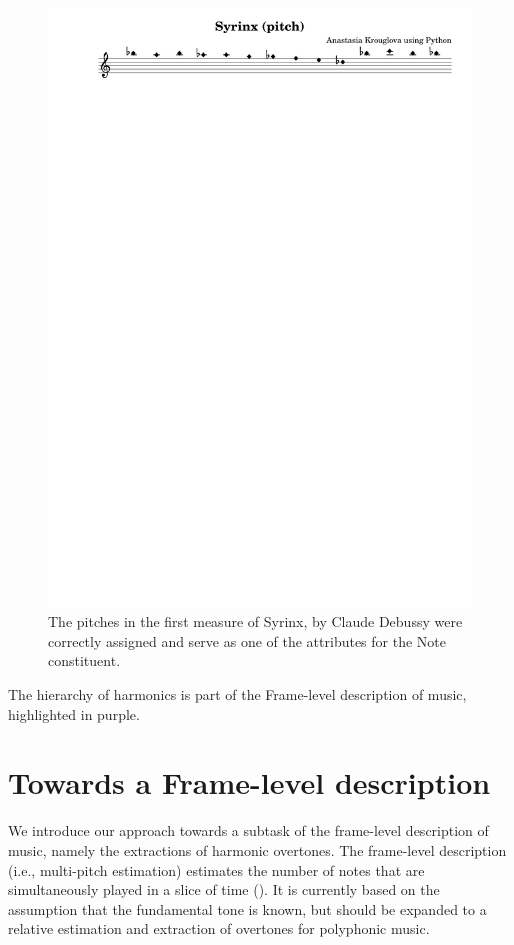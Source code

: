 \begin{figure}[h]
\centering
\includegraphics[width=0.9\linewidth]{images/applications/pitches_syrinx.pdf}
\caption{The pitches in the first measure of Syrinx, by Claude Debussy were correctly assigned and serve as one of the attributes for the Note constituent.}
\label{syrinx_artificial} 
\end{figure}

\begin{marginfigure}
\centering
\vspace{1.8cm}

\vspace{0.1cm}
\caption{The hierarchy of harmonics is part of the Frame-level description of music, highlighted in purple.}
\label{harmonyExtraction} 
\end{marginfigure}


\section{Towards a Frame-level description}
We introduce our approach towards a subtask of the frame-level description of music, namely the extractions of harmonic overtones. The frame-level description (i.e., multi-pitch estimation) estimates the number of notes that are simultaneously played in a slice of time (\cite{benetos_automatic_2019}). It is currently based on the assumption that the fundamental tone is known, but should be expanded to a relative estimation and extraction of overtones for polyphonic music.


